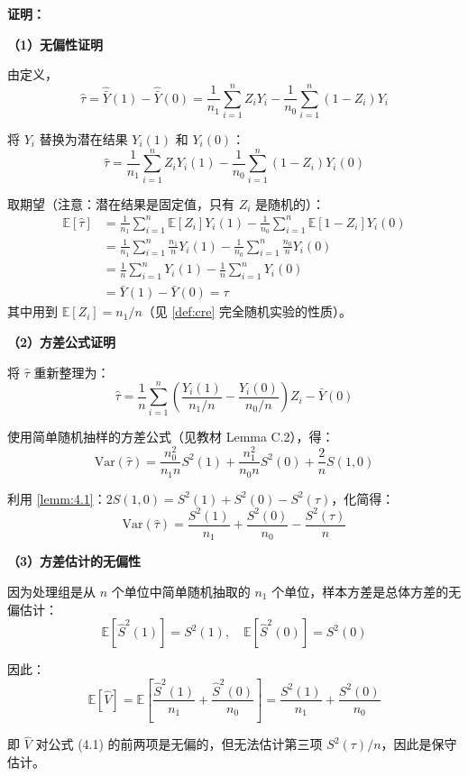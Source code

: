 \textbf{证明：}

\textbf{（1）无偏性证明}

由定义，
\[
\hat{\tau} = \hat{\bar{Y}}(1) - \hat{\bar{Y}}(0) = \frac{1}{n_1}\sum_{i=1}^n Z_i Y_i - \frac{1}{n_0}\sum_{i=1}^n (1-Z_i)Y_i
\]

将 $Y_i$ 替换为潜在结果 $Y_i(1)$ 和 $Y_i(0)$：
\[
\hat{\tau} = \frac{1}{n_1}\sum_{i=1}^n Z_i Y_i(1) - \frac{1}{n_0}\sum_{i=1}^n (1-Z_i)Y_i(0)
\]

取期望（注意：潜在结果是固定值，只有 $Z_i$ 是随机的）：
\[
\begin{aligned}
\mathbb{E}[\hat{\tau}] &= \frac{1}{n_1}\sum_{i=1}^n \mathbb{E}[Z_i]Y_i(1) - \frac{1}{n_0}\sum_{i=1}^n \mathbb{E}[1-Z_i]Y_i(0) \\
&= \frac{1}{n_1}\sum_{i=1}^n \frac{n_1}{n}Y_i(1) - \frac{1}{n_0}\sum_{i=1}^n \frac{n_0}{n}Y_i(0) \\
&= \frac{1}{n}\sum_{i=1}^n Y_i(1) - \frac{1}{n}\sum_{i=1}^n Y_i(0) \\
&= \bar{Y}(1) - \bar{Y}(0) = \tau
\end{aligned}
\]
其中用到 $\mathbb{E}[Z_i] = n_1/n$（见 \cref{def:cre} 完全随机实验的性质）。

\textbf{（2）方差公式证明}

将 $\hat{\tau}$ 重新整理为：
\[
\hat{\tau} = \frac{1}{n}\sum_{i=1}^n \left( \frac{Y_i(1)}{n_1/n} - \frac{Y_i(0)}{n_0/n} \right) Z_i - \bar{Y}(0)
\]

使用简单随机抽样的方差公式（见教材 Lemma C.2），得：
\[
\text{Var}(\hat{\tau}) = \frac{n_0^2}{n_1 n} S^2(1) + \frac{n_1^2}{n_0 n} S^2(0) + \frac{2}{n} S(1,0)
\]

利用 \cref{lemm:4.1}：$2S(1,0) = S^2(1) + S^2(0) - S^2(\tau)$，化简得：
\[
\text{Var}(\hat{\tau}) = \frac{S^2(1)}{n_1} + \frac{S^2(0)}{n_0} - \frac{S^2(\tau)}{n}
\]

\textbf{（3）方差估计的无偏性}

因为处理组是从 $n$ 个单位中简单随机抽取的 $n_1$ 个单位，样本方差是总体方差的无偏估计：
\[
\mathbb{E}[\hat{S}^2(1)] = S^2(1), \quad \mathbb{E}[\hat{S}^2(0)] = S^2(0)
\]

因此：
\[
\mathbb{E}[\hat{V}] = \mathbb{E}\left[\frac{\hat{S}^2(1)}{n_1} + \frac{\hat{S}^2(0)}{n_0}\right] = \frac{S^2(1)}{n_1} + \frac{S^2(0)}{n_0}
\]

即 $\hat{V}$ 对公式 (4.1) 的前两项是无偏的，但无法估计第三项 $S^2(\tau)/n$，因此是保守估计。


